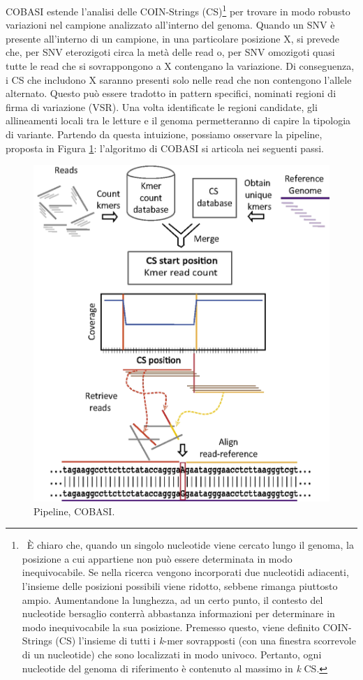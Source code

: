 \documentclass[../main.tex]{subfiles}
\begin{document}
COBASI estende l'analisi delle COIN-Strings (CS)\footnote{\ È chiaro che, quando un singolo nucleotide viene cercato lungo il genoma, la posizione a cui appartiene non può essere determinata in modo inequivocabile. Se nella ricerca vengono incorporati due nucleotidi adiacenti, l'insieme delle posizioni possibili viene ridotto, sebbene rimanga piuttosto ampio. Aumentandone la lunghezza, ad un certo punto, il contesto del nucleotide bersaglio conterrà abbastanza informazioni per determinare in modo inequivocabile la sua posizione. Premesso questo, viene definito COIN-Strings (CS) l'insieme di tutti i \textit{k}-mer sovrapposti (con una finestra scorrevole di un nucleotide) che sono localizzati in modo univoco. Pertanto, ogni nucleotide del genoma di riferimento è contenuto al massimo in \textit{k} CS.} per trovare in modo robusto variazioni nel campione analizzato all'interno del genoma. Quando un SNV è presente all'interno di un campione, in una particolare posizione X, si prevede che, per SNV eterozigoti circa la metà delle read o, per SNV omozigoti quasi tutte le read che si sovrappongono a X contengano la variazione. Di conseguenza, i CS che includono X saranno presenti solo nelle read che non contengono l'allele alternato. Questo può essere tradotto in pattern specifici, nominati regioni di firma di variazione (VSR). Una volta identificate le regioni candidate, gli allineamenti locali tra le letture e il genoma permetteranno di capire la tipologia di variante. Partendo da questa intuizione, possiamo osservare la pipeline, proposta in Figura \ref{fig:cobasi}: l'algoritmo di COBASI si articola nei seguenti passi.

 \begin{figure}[h!]
	\centering
  	\captionsetup{justification=centering}
  	\includegraphics[scale=.20]{images/cobasi_pipeline.png}
  	\caption{Pipeline, COBASI.}
  	\label{fig:cobasi}
\end{figure}
\end{document}
